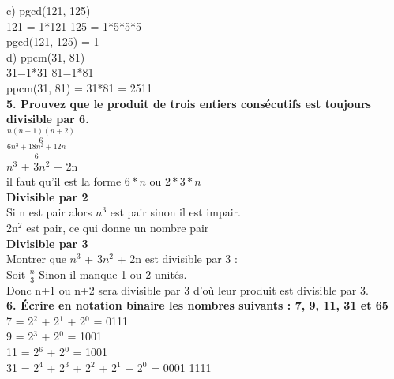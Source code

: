 c) pgcd(121, 125) \\
121 = 1*121  125 = 1*5*5*5 \\
pgcd(121, 125) = 1 \\

d) ppcm(31, 81) \\
31=1*31 81=1*81 \\
ppcm(31, 81) = 31*81 = 2511 \\


\textbf{5. Prouvez que le produit de trois entiers consécutifs est toujours divisible par 6.} \\

$\frac{n(n+1)(n+2)} {6}$ \\

$\frac{6n^{3} + 18n^{2} + 12n}{6}$ \\

$n^{3}$ + $3n^{2}$ + 2n \\

il faut qu'il est la forme $6*n$ ou $2*3*n$ \\

\textbf{Divisible par 2} \\

Si n est pair alors $n^{3}$ est pair sinon il est impair. \\

2n$^{2}$ est pair, ce qui donne un nombre pair \\


\textbf{Divisible par 3} \\

Montrer que $n^{3}$ + $3n^{2}$ + 2n est divisible par 3 : \\

Soit $\frac{n}{3}$ Sinon il manque 1 ou 2 unités. \\

Donc n+1 ou n+2 sera divisible par 3 d'où leur produit est divisible par 3.\\


\textbf{6. Écrire en notation binaire les nombres suivants : 7, 9, 11, 31 et 65} \\

7 = 2$^{2}$ + 2$^{1}$ + 2$^{0}$ = 0111 \\

9 = 2$^{3}$ + 2$^{0}$ = 1001 \\

11 = 2$^{6}$ + 2$^{0}$ = 1001 \\

31 = 2$^{4}$ + 2$^{3}$ + 2$^{2}$ + 2$^{1}$ + 2$^{0}$ = 0001 1111 \\

